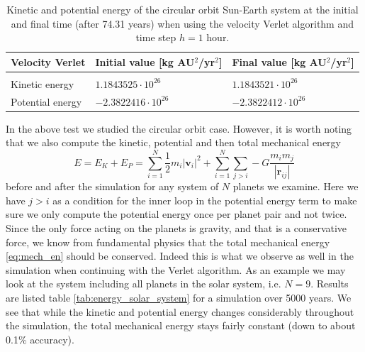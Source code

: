 \documentclass[12pt]{article}
\numberwithin{figure}{section}
\numberwithin{table}{section}
\begin{document}
\begin{table}[ht]
\begin{center}
  \begin{tabular}{| l | l | l |}
  \hline
    Velocity Verlet &  Initial value [kg AU$^2$/yr$^2$] & Final value [kg AU$^2$/yr$^2$]\\[0.10cm]\hline\hline
     & &\\
     Kinetic energy & $1.1843525\cdot 10^{26}$ & $1.1843521\cdot 10^{26}$\\[0.10cm]
     Potential energy & $-2.3822416\cdot 10^{26}$ & $-2.3822412\cdot 10^{26}$\\[0.10cm]
     \hline
  \end{tabular}
\end{center}
\caption{Kinetic and potential energy of the circular orbit Sun-Earth system at the initial and final time (after 74.31 years) when using the velocity Verlet algorithm and time step $h=1$ hour.}
\label{tab:energy_verlet}
\end{table}

\noindent In the above test we studied the circular orbit case. However, it is worth noting that we also compute the kinetic, potential and then total mechanical energy
\begin{equation}
	E=E_K+E_P=\sum_{i=1}^N\frac{1}{2}m_i|\mathbf{v}_i|^2+\sum_{i=1}^N\sum_{j>i}-G\frac{m_im_j}{|\mathbf{r}_{ij}|}\label{eq:mech_en}
\end{equation}
before and after the simulation for any system of $N$ planets we examine. Here we have $j>i$ as a condition for the inner loop in the potential energy term to make sure we only compute the potential energy once per planet pair and not twice. \\
\noindent Since the only force acting on the planets is gravity, and that is a conservative force, we know from fundamental physics that the total mechanical energy \eqref{eq:mech_en} should be conserved. Indeed this is what we observe as well in the simulation when continuing with the Verlet algorithm. As an example we may look at the system including all planets in the solar system, i.e. $N=9$. Results are listed table \ref{tab:energy_solar_system} for a simulation over 5000 years. We see that while the kinetic and potential energy changes considerably throughout the simulation, the total mechanical energy stays fairly constant (down to about 0.1\% accuracy).
\end{document}
